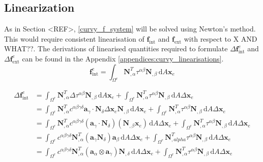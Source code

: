 \documentclass[../main.tex]{subfiles}
\begin{document}
\subsection{Linearization}
As in Section <REF>, \eqref{curvy_f_system} will be solved using Newton's method. This would require consistent linearisation of $\mathbf{f}_{\text{int}}$ and $\mathbf{f}_{\text{ext}}$ with respect to
 X AND WHAT??. The derivations of linearised quantities required to formulate $\Delta \mathbf{f}_{\text{int}}^{e}$ and $\Delta \mathbf{f}_{\text{ext}}^{e}$ can be found in the Appendix \ref{appendices:curvy_linearisations}.
\begin{equation}\label{eq:f_int}
\mathbf{f}_{\mathrm{int}}^{e} = \int_{\Omega^{e}} \mathbf{N}^{T}_{, \alpha} \tau^{\alpha \beta} \mathbf{N}_{, \beta} \, \mathrm{d} A \mathbf{x}_{e}
\end{equation}

\begin{equation}\label{eq:del_f_int}
    \begin{split}
    \Delta \mathbf{f}_{\mathrm{int}}^{e} &= \int_{\Omega^{e}} \mathbf{N}^{T}_{, \alpha} \Delta \tau^{\alpha \beta} \mathbf{N}_{, \beta} \, \mathrm{d} A \mathbf{x}_{e} + \int_{\Omega^{e}} \mathbf{N}_{, \alpha}^{T} \tau^{\alpha \beta} \mathbf{N}_{, \beta} \, \mathrm{d} A \Delta \mathbf{x}_{e} \\ &= \int_{\Omega^{e}} \mathbf{N}_{, \alpha}^{T} c^{\alpha \beta \gamma \delta} \boldsymbol{a}_{\gamma} \cdot \mathbf{N}_{\delta} \Delta \mathbf{x}_{e} \mathbf{N}_{, \beta} \, \mathrm{d} A \mathbf{x}_{e} + \int_{\Omega^{e}} \mathbf{N}_{, \alpha}^{T} \tau^{\alpha \beta} \mathbf{N}_{, \beta} \, \mathrm{d} A \Delta \mathbf{x}_{e} \\ &= \int_{\Omega^{e}} \mathbf{N}^{T}_{,\alpha} c^{\alpha \beta \gamma \delta} \left( \boldsymbol{a}_{\gamma} \cdot \mathbf{N}_{\delta} \right) \left( \mathbf{N}_{, \beta} \mathbf{x}_{e} \right) \, \mathrm{d} A \Delta \mathbf{x}_{e} + \int_{\Omega^{e}} \mathbf{N}_{, \alpha}^{T} \tau^{\alpha \beta} \mathbf{N}_{, \beta} \, \mathrm{d} A \Delta \mathbf{x}_{e} \\ &= \int_{\Omega^{e}} c^{\alpha \beta \gamma \delta} \mathbf{N}_{, \alpha}^{T} \left( \boldsymbol{a}_{\gamma} \mathbf{N}_{\delta} \right) \boldsymbol{a}_{\beta} \, \mathrm{d} A \Delta \mathbf{x}_{e} + \int_{\Omega^{e}} \mathbf{N}_{, alpha}^{T} \tau^{\alpha \beta} \mathbf{N}_{, \beta} \, \mathrm{d} A \Delta \mathbf{x}_{e} \\ &= \int_{\Omega^{e}} c^{\alpha \beta \gamma \delta} \mathbf{N}_{, \alpha}^{T} \left( \boldsymbol{a}_{\alpha} \otimes \boldsymbol{a}_{\gamma} \right) \mathbf{N}_{, \delta} \, \mathrm{d} A \Delta \mathbf{x}_{e} + \int_{\Omega^{e}} \mathbf{N}_{, \alpha}^{T} \tau^{\alpha \beta} \mathbf{N}_{, \beta} \, \mathrm{d} A \Delta \mathbf{x}_{e}
    \end{split}
\end{equation}
\end{document}
